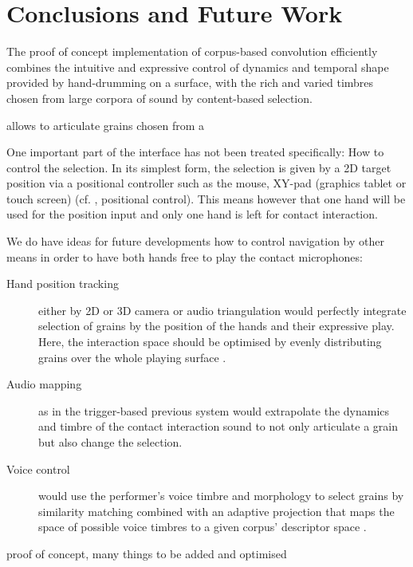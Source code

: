\section{Conclusions and Future Work}

The proof of concept implementation of corpus-based convolution efficiently combines the intuitive and expressive control of dynamics and temporal shape provided by hand-drumming on a surface, with the rich and varied timbres chosen from large corpora of sound by content-based selection.

 allows to articulate grains chosen from a

One important part of the interface has not been treated specifically: How to control the selection.  In its simplest form, the selection is given by a 2D target position via a positional controller such as the mouse, XY-pad (graphics tablet or touch screen) (cf. \cite{Schwarz-nime2012-sound-space}, positional control).
This means however that one hand will be used for the position input and only one hand is left for contact interaction.

We do have ideas for future developments how to control navigation by other means in order to have both hands free to play the contact microphones:

\begin{description}
\item[Hand position tracking] either by 2D or 3D camera or audio triangulation would perfectly integrate selection of grains by the position of the hands and their expressive play.  Here, the interaction space should be optimised by evenly distributing grains over the whole playing surface \cite{LallemandSchwarz-dafx2011-distribute}.
\item[Audio mapping] as in the trigger-based previous system would extrapolate the dynamics and timbre of the contact interaction sound to not only articulate a grain but also change the selection.
\item[Voice control] would use the performer's voice timbre and morphology to select grains by similarity matching combined with an adaptive projection that maps the space of possible voice timbres to a given corpus' descriptor space \cite{StowellPlumbley-smc2010-timbre-remapping-regression-tree,Fasciani-si2013b}.
\end{description}

proof of concept, many things to be added and optimised

